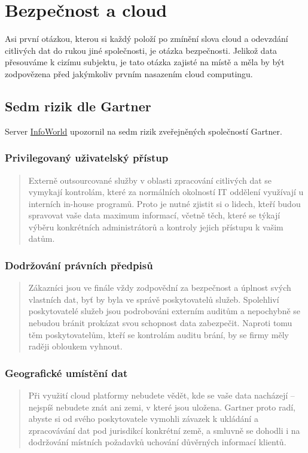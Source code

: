 \newpage
\section{Bezpečnost a cloud}
Asi první otázkou, kterou si každý položí po zmínění slova cloud a odevzdání citlivých dat do rukou jiné společnosti, je otázka bezpečnosti. Jelikož data přesouváme k cizímu subjektu, je tato otázka zajisté na místě a měla by být zodpovězena před jakýmkoliv prvním nasazením cloud computingu.

\subsection{Sedm rizik dle Gartner}
Server \href{http://www.infoworld.com/d/security-central/gartner-seven-cloud-computing-security-risks-853}{InfoWorld}\cite{infoworld:7rizik} upozornil na sedm rizik zveřejněných společností Gartner.

\subsubsection{Privilegovaný uživatelský přístup}
\begin{quote}
Externě outsourcované služby v oblasti zpracování citlivých dat se vymykají kontrolám, které za normálních okolností IT oddělení využívají u interních in-house programů. Proto je nutné zjistit si o lidech, kteří budou spravovat vaše data maximum informací, včetně těch, které se týkají výběru konkrétních administrátorů a kontroly jejich přístupu k vašim datům.\cite{cloud.cz:7rizik}
\end{quote}

\subsubsection{Dodržování právních předpisů}
\begin{quote}
Zákazníci jsou ve finále vždy zodpovědní za bezpečnost a úplnost svých vlastních dat, byť by byla ve správě poskytovatelů služeb. Spolehliví poskytovatelé služeb jsou podrobováni externím auditům a nepochybně se nebudou bránit prokázat svou schopnost data zabezpečit. Naproti tomu těm poskytovatelům, kteří se kontrolám auditu brání, by se firmy měly raději obloukem vyhnout.\cite{cloud.cz:7rizik}
\end{quote}

\subsubsection{Geografické umístění dat}
\begin{quote}
Při využití cloud platformy nebudete vědět, kde se vaše data nacházejí – nejspíš nebudete znát ani zemi, v které jsou uložena. Gartner proto radí, abyste si od svého poskytovatele vymohli závazek k ukládání a zpracovávání dat pod jurisdikcí konkrétní země, a smluvně se dohodli i na dodržování místních požadavků uchování důvěrných informací klientů.\cite{cloud.cz:7rizik}
\end{quote}


